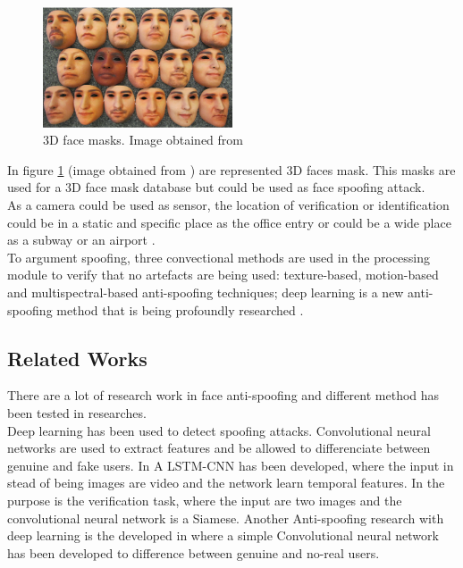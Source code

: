 \begin{figure}[htb]
\centering
\includegraphics[width=0.5\textwidth]{images_miscelaneus/fig_masks.png}
\caption{3D face masks. Image obtained from \cite{3dmask}} \label{fig:3dMasks}
\end{figure}

In figure \ref{fig:3dMasks} (image obtained from \cite{3dmask}) are represented 3D faces mask. This masks are used for a 3D face mask database but could be used as face spoofing attack.\\

As a camera could be used as sensor, the location of verification or identification could be in a static and specific place as the office entry or could be a wide place as a subway or an airport \cite{survey2}.\\

To argument spoofing, three convectional methods are used in the processing module to verify that no artefacts are being used: texture-based, motion-based and multispectral-based anti-spoofing techniques; deep learning is a new anti-spoofing method that is being  profoundly researched \cite{LSTM-CNN}.


\subsection{Related Works}
There are a lot of research work in face anti-spoofing and different method has been tested in researches.\\

Deep learning has been used to detect spoofing attacks. Convolutional neural networks are used to extract features and be allowed to differenciate between genuine and fake users. In \cite{LSTM-CNN} A LSTM-CNN has been developed, where the input in stead of being images are video and the network learn temporal features. In \cite{Verification} the purpose is the verification task, where the input are two images and the convolutional neural network is a Siamese. Another Anti-spoofing research with deep learning is the developed in \cite{yangLL14} where a simple Convolutional neural network has been developed to difference between genuine and no-real users.\\

